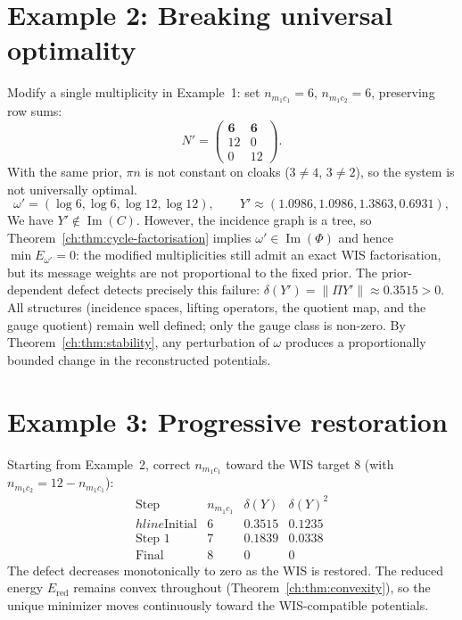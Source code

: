 \section{Example 2: Breaking universal optimality}\label{ch:sec:example-2-breaking-universal-optimality}
Modify a single multiplicity in Example~1: set $n_{m_1c_1}=6$,
$n_{m_1c_2}=6$, preserving row sums:
\[
N'=\begin{pmatrix}\mathbf6&\mathbf6\\12&0\\0&12\end{pmatrix}.
\]
With the same prior, $\pi n$ is not constant on cloaks
($3\neq4$, $3\neq2$), so the system is not universally optimal.
\[
\omega' = (\log6,\log6,\log12,\log12),\qquad
Y' \approx (1.0986,1.0986,1.3863,0.6931),
\]
We have $Y'\notin\operatorname{Im}(C)$.  However, the incidence graph
is a tree, so Theorem~\ref{ch:thm:cycle-factorisation}
implies $\omega'\in\operatorname{Im}(\Phi)$ and hence
$\min E_{\omega'}=0$: the modified multiplicities still admit an exact
WIS factorisation, but its message weights are not proportional to the
fixed prior.  The prior-dependent defect detects precisely this failure:
$\delta(Y') = \|\Pi Y'\| \approx 0.3515 > 0.$
All structures (incidence spaces, lifting operators, the quotient map,
and the gauge quotient) remain well defined; only the gauge class is non-zero.  By
Theorem~\ref{ch:thm:stability}, any perturbation of $\omega$ produces a
proportionally bounded change in the reconstructed potentials.
\section{Example 3: Progressive restoration}\label{ch:sec:example-3-progressive-restoration}
Starting from Example~2, correct $n_{m_1c_1}$ toward the WIS target
$8$ (with $n_{m_1c_2}=12-n_{m_1c_1}$):
\[
\begin{array}{cccc}
\text{Step} & n_{m_1c_1} & \delta(Y) & \delta(Y)^2 \\hline
\text{Initial} & 6 & 0.3515 & 0.1235 \\
\text{Step 1} & 7 & 0.1839 & 0.0338 \\
\text{Final} & 8 & 0 & 0
\end{array}
\]
The defect decreases monotonically to zero as the WIS is restored.
The reduced energy $E_{\mathrm{red}}$ remains convex throughout
(Theorem~\ref{ch:thm:convexity}), so the unique minimizer moves
continuously toward the WIS-compatible potentials.
